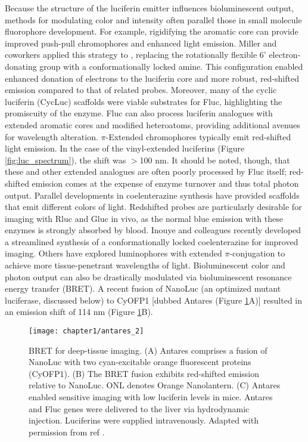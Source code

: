 Because the structure of the luciferin emitter influences
bioluminescent output, methods for modulating color and
intensity often parallel those in small molecule fluorophore
development. For example, rigidifying the aromatic core can
provide improved push-pull chromophores and enhanced
light emission. Miller and coworkers applied this strategy to \dluciferin{},
replacing the rotationally flexible 6' electron-donating
group with a conformationally locked amine.\cite{Reddy:2010gaa} This configuration
enabled enhanced donation of electrons to the luciferin
core and more robust, red-shifted emission compared to that of
related probes.\cite{Chu:2016im} Moreover, many of the cyclic luciferin (CycLuc)
scaffolds were viable substrates for Fluc, highlighting the
promiscuity of the enzyme.
Fluc can also process luciferin analogues with extended
aromatic cores and modified heteroatoms, providing additional
avenues for wavelength alteration.\cite{McCutcheon:2012ixb,Woodroofe:2012vx,RN100} $\pi$-Extended chromophores
typically emit red-shifted light emission.\cite{Kuchimaru:2016eba} In the case of
the vinyl-extended luciferins (Figure \ref{fig:luc_spectrum}), the shift was $>$100 nm.
It should be noted, though, that these and other extended
analogues are often poorly processed by Fluc itself; red-shifted
emission comes at the expense of enzyme turnover and thus
total photon output.
Parallel developments in coelenterazine synthesis have
provided scaffolds that emit different colors of light. Redshifted
probes are particularly desirable for imaging with Rluc
and Gluc in vivo, as the normal blue emission with these
enzymes is strongly absorbed by blood.\cite{Zhao:2005if} Inouye and colleagues
recently developed a streamlined synthesis of a conformationally
locked coelenterazine for improved imaging.\cite{Hosoya:2015iu} Others have
explored luminophores with extended $\pi$-conjugation to achieve
more tissue-penetrant wavelengths of light.\cite{Nishihara:2014cr,Grinstead:2016gh}
Bioluminescent color and photon output can also be
drastically modulated via bioluminescent resonance energy
transfer (BRET). A recent fusion of NanoLuc (an optimized
mutant luciferase, discussed below) to CyOFP1 [dubbed
Antares (Figure \ref{fig:antares}A)] resulted in an emission shift of 114 nm
(Figure \ref{fig:antares}B).\cite{Chu:2016im}

\begin{figure}[htbp]
\texttt{[image: chapter1/antares\_2]}
\centering
\caption[BRET for deep-tissue imaging]{BRET for deep-tissue imaging. (A) Antares comprises a
fusion of NanoLuc with two cyan-excitable orange fluorescent proteins
(CyOFP1). (B) The BRET fusion exhibits red-shifted emission
relative to NanoLuc. ONL denotes Orange Nanolantern. (C) Antares enabled
sensitive imaging with low luciferin levels in mice. Antares and
Fluc genes were delivered to the liver via hydrodynamic injection.
Luciferins were supplied intravenously. Adapted with permission from
ref \cite{Chu:2016im}.}
  \label{fig:antares}
\end{figure}

